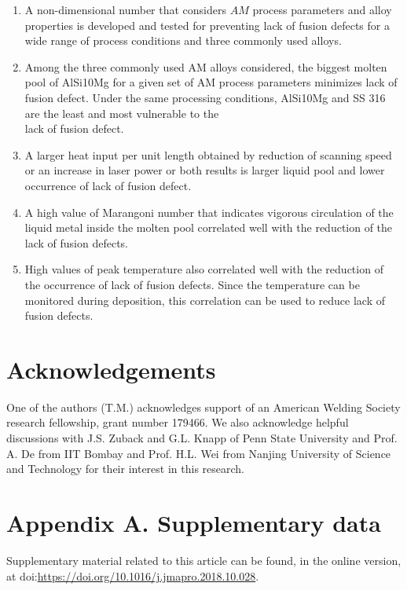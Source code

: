 \documentclass[10pt]{article}
\begin{document}
\begin{enumerate}
  \item A non-dimensional number that considers $A M$ process parameters and alloy properties is developed and tested for preventing lack of fusion defects for a wide range of process conditions and three commonly used alloys.

  \item Among the three commonly used AM alloys considered, the biggest molten pool of AlSi10Mg for a given set of AM process parameters minimizes lack of fusion defect. Under the same processing conditions, AlSi10Mg and SS 316 are the least and most vulnerable to the\\
lack of fusion defect.

  \item A larger heat input per unit length obtained by reduction of scanning speed or an increase in laser power or both results is larger liquid pool and lower occurrence of lack of fusion defect.

  \item A high value of Marangoni number that indicates vigorous circulation of the liquid metal inside the molten pool correlated well with the reduction of the lack of fusion defects.

  \item High values of peak temperature also correlated well with the reduction of the occurrence of lack of fusion defects. Since the temperature can be monitored during deposition, this correlation can be used to reduce lack of fusion defects.

\end{enumerate}

\section*{Acknowledgements}
One of the authors (T.M.) acknowledges support of an American Welding Society research fellowship, grant number 179466. We also acknowledge helpful discussions with J.S. Zuback and G.L. Knapp of Penn State University and Prof. A. De from IIT Bombay and Prof. H.L. Wei from Nanjing University of Science and Technology for their interest in this research.

\section*{Appendix A. Supplementary data}
Supplementary material related to this article can be found, in the online version, at doi:\href{https://doi.org/10.1016/j.jmapro.2018.10.028}{https://doi.org/10.1016/j.jmapro.2018.10.028}.
\end{document}
